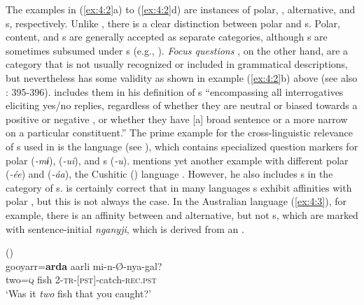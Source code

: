 \largerpage[-2]
\noindent The examples in (\ref{ex:4:2}a) to (\ref{ex:4:2}d) are instances of polar, , alternative, and s, respectively. Unlike , there is a clear distinction between polar and s. Polar, content, and s are generally accepted as separate categories, although s are sometimes subsumed under s (e.g., \citealt{Siemund2001}). \textit{Focus questions} \citep{Kiefer1980}, on the other hand, are a category that is not usually recognized or included in grammatical descriptions, but nevertheless has some validity as shown in example (\ref{ex:4:2}b) above (see also \citealt{Dixon2012}: 395-396). \citet[2]{Miestamo2011} includes them in his definition of s “encompassing all interrogatives eliciting yes/no replies, regardless of whether they are neutral or biased towards a positive or negative , or whether they have [a] broad sentence  or a more narrow  on a particular constituent.” The prime example for the cross-linguistic relevance of s used in \cite{Hölzl2016a} is the  language  (see ), which contains specialized question markers for polar (\textit{-mɨ}),  (\textit{-ui}), and s (\textit{-u}). \citet[396]{Dixon2012} mentions yet another example with different polar (\textit{-ée}) and   (\textit{-áa}), the Cushitic () language . However, he also includes s in the category of s. \citet{Miestamo2011} is certainly correct that in many languages s exhibit affinities with polar , but this is not always the case. In the Australian language  (\ref{ex:4:3}), for example, there is an affinity between  and alternative, but not s, which are marked with sentence-initial \textit{nganyji}, which is derived from an .

\ea%
    \label{ex:4:3}
    \ea
	 ()\\
    \gll gooyarr=\textbf{{arda}} aarli  mi-n-Ø-nya-gal?\\
    two=\textsc{q}      fish  2-\textsc{tr}-[\textsc{pst}]-catch-\textsc{rec.pst}\\
    \glt ‘Was it \textit{two} fish that you caught?’\\

